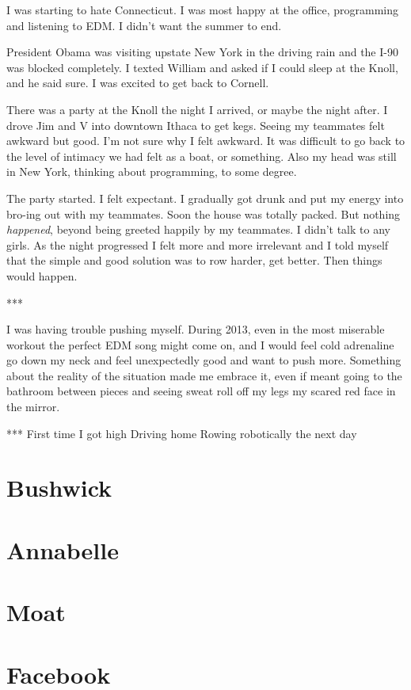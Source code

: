 \documentclass[12pt]{article}
\begin{document}
I was starting to hate Connecticut.  I was most happy at the office, programming
and listening to EDM.  I didn't want the summer to end.

President Obama was visiting upstate New York in the driving rain and the I-90
was blocked completely.  I texted William and asked if I could sleep at the
Knoll, and he said sure.  I was excited to get back to Cornell.

There was a party at the Knoll the night I arrived, or maybe the night after.  I
drove Jim and V into downtown Ithaca to get kegs.  Seeing my teammates felt
awkward but good.  I'm not sure why I felt awkward.  It was difficult to go back
to the level of intimacy we had felt as a boat, or something.  Also my head was
still in New York, thinking about programming, to some degree.    

The party started.  I felt expectant.  I gradually got drunk and put my energy
into bro-ing out with my teammates.  Soon the house was totally packed.  But
nothing \textit{happened}, beyond being greeted happily by my teammates.  I
didn't talk to any girls.  As the night progressed I felt more and more
irrelevant and I told myself that the simple and good solution was to row
harder, get better.  Then things would happen.

***

I was having trouble pushing myself.  During 2013, even in the most miserable
workout the perfect EDM song might come on, and I would feel cold adrenaline go
down my neck and feel unexpectedly good and want to push more.  Something about
the reality of the situation made me embrace it, even if meant going to the
bathroom between pieces and seeing sweat roll off my legs my scared red face in
the mirror.  

***
First time I got high
Driving home
Rowing robotically the next day

\section{Bushwick}


\section{Annabelle}


\section{Moat}


\section{Facebook}
\end{document}
